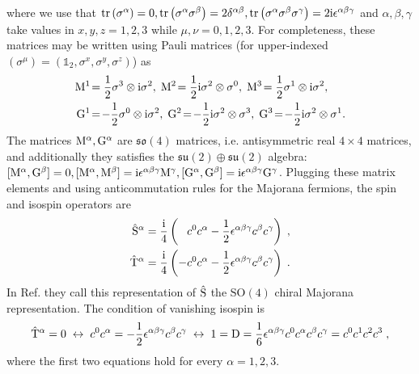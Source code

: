 where we use that $\mathrm{tr} \left( \sigma^\alpha \right) = 0, \mathrm{tr} \left( \sigma^\alpha \sigma^\beta \right) = 2 \delta^{\alpha\beta},  \mathrm{tr} \left(  \sigma^\alpha \sigma^\beta \sigma^\gamma \right) = 2 \mathrm{i} \epsilon^{\alpha\beta\gamma} $ and  $\alpha,\beta,\gamma$ take values in $x,y,z=1,2,3$ while $\mu,\nu=0,1,2,3$. For completeness, these matrices may be written using Pauli matrices \cite{Seifert_2018} (for upper-indexed  $(\sigma^\mu)=(\mathbb{1}_2,\sigma^x,\sigma^y,\sigma^z)$) as
\begin{align}
    \rmM^1 \!&=\frac12 \sigma^3 \otimes  \im  \sigma^2, \;
    \rmM^2 \!=  \frac12\im \sigma^2 \otimes  \sigma^0, \;
    \rmM^3 \!=\frac12 \sigma^1 \otimes   \im \sigma^2, \\
    \rmG^1 \!&=\! -\frac12\sigma^0 \otimes  \im  \sigma^2, \;
    \rmG^2 \!=\!- \frac12 \im \sigma^2 \otimes  \sigma^3, \;
    \rmG^3 \!=\!- \frac12 \im \sigma^2 \otimes \sigma^1.
\end{align}
The matrices $\mathrm{M}^\alpha, \mathrm{G}^\alpha$ are $\mathfrak{so}(4)$ matrices, i.e. antisymmetric real $4\times 4$ matrices, and additionally they satisfies the $\mathfrak{su}(2) \oplus \mathfrak{su}(2)$ algebra: $
[ \mathrm{M}^\alpha, \mathrm{G}^\beta]=0,
[ \mathrm{M}^\alpha, \mathrm{M}^\beta]= \mathrm{i} \epsilon^{\alpha\beta\gamma} \mathrm{M}^\gamma,
[ \mathrm{G}^\alpha, \mathrm{G}^\beta]= \mathrm{i} \epsilon^{\alpha\beta\gamma} \mathrm{G}^\gamma$.
Plugging these matrix elements and using anticommutation rules for the Majorana fermions, the spin and isospin operators are
\begin{equation}
\begin{split}
     \hat{\mathrm{S}}^\alpha
     &= \frac{\mathrm{i}}{4} \left( \phantom{-} c^0 c^\alpha - \frac{1}{2} \epsilon^{\alpha\beta\gamma} c^\beta c^\gamma \right)
     \; , \\
     \hat{\mathrm{T}}^\alpha
     &=  \frac{\mathrm{i}}{4} \left( -c^0 c^\alpha - \frac{1}{2} \epsilon^{\alpha\beta\gamma} c^\beta c^\gamma \right)
     \; .
\end{split}
\end{equation}
In Ref. \cite{Fu2018} they call this representation of $\hat{\mathrm{S}}$ the $\mathrm{SO}(4)$ chiral Majorana representation.
The condition of vanishing isospin is
\begin{equation}
    \hat{\mathrm{T}}^\alpha = 0
    \; \leftrightarrow \;
    c^0 c^\alpha = - \frac{1}{2} \epsilon^{\alpha\beta\gamma} c^\beta c^\gamma
    \; \leftrightarrow \;
   1=  \mathrm{D} = \frac{1}{6} \epsilon^{\alpha\beta\gamma}  c^0 c^\alpha   c^\beta c^\gamma = c^0 c^1   c^2 c^3 \; ,
\end{equation}
where the first two equations hold for every $\alpha=1,2,3$.




